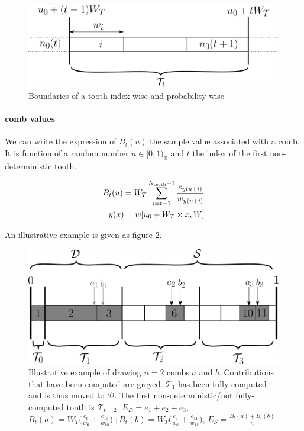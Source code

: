 \documentclass[./thesis.tex]{subfiles}
\begin{document}
\begin{figure}[h!]
	\begin{center}
		\includegraphics[width=0.7\columnwidth]{figures/pt2/tooththreshold}
	\end{center}
	\caption{Boundaries of a tooth index-wise and probability-wise}
	\label{fig:boundaries_teeth}
\end{figure}


\paragraph{comb values}

We can write the expression of $B_t(u)$ the sample value associated with a comb. It is function of a random number $u \in [0,1)_\mathbb{R}$ and $t$ the index of the first non-deterministic tooth.

\begin{align}
\label{eq:combvalue}
B_t(u) = W_T \sum_{i=t-1}^{N_\text{teeth}-1} \frac{e_{y(u+i)}}{w_{y(u+i)}} \\
y(x)=w[u_0+ W_T \times x, W]
\end{align}

An illustrative example is given as figure \ref{fig:toothindet}.

 \begin{figure}[h!]
	\begin{center}
		\includegraphics[width=0.75\columnwidth]{figures/pt2/toothindet}
	\end{center}
		\caption{Illustrative example of drawing $n=2$ combs $a$ and $b$. Contributions that have been computed are greyed. $\mathcal{T}_1$ has been fully computed and is thus moved to $\mathcal{D}$. The first non-deterministic/not fully-computed tooth is $\mathcal{T}_{t=2}$.
		$ E_D = e_1 + e_2 + e_3 $, 
		$B_t(a) = W_T \Big ( \frac{e_6}{w_6} + \frac{e_{10}}{w_{10}} \Big ) \;;B_t(b) = W_T \Big ( \frac{e_6}{w_6} + \frac{e_{11}}{w_{11}} \Big )$, 
		$E_S = \frac{B_t(a)+B_t(b)}{n}$}
		\label{fig:toothindet}
\end{figure}
\end{document}
